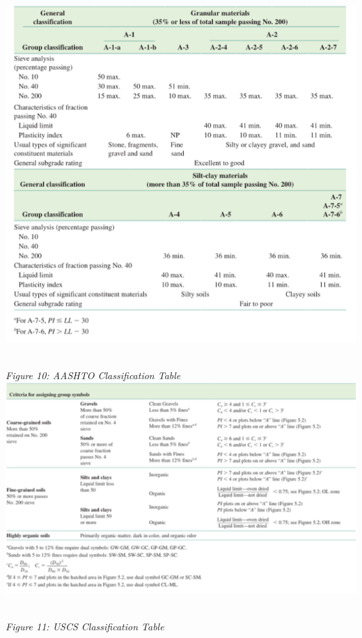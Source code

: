 \documentclass{article}
\begin{document}
\begin{center}
\includegraphics*[scale=0.5]{fig3.png}
\emph{\\Figure 10: AASHTO Classification Table\\}
\includegraphics*[scale=0.8]{fig4.png}
\emph{\\Figure 11: USCS Classification Table\\}

\end{center}
\end{document}
